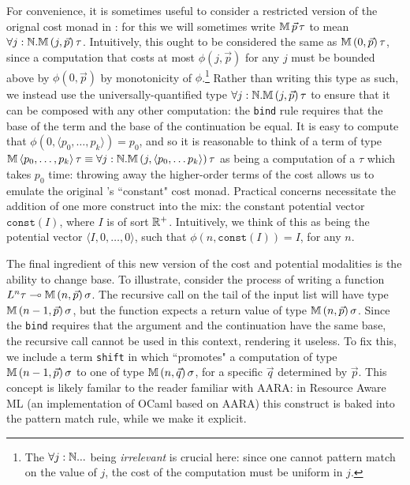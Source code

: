 For convenience, it is sometimes useful to consider a restricted version of the orignal \lambdaamor cost monad in \dlambdaamor: for this we will sometimes write $\mathbb{M} \, \vec{p} \, \tau$ to mean $\forall j : \mathbb{N}. \mathbb{M} \, (j,\vec{p}) \, \tau$. Intuitively, this ought to be considered the same as $\mathbb{M} \, (0,\vec{p}) \, \tau$, since a computation that costs at most $\phi(j,\vec{p})$ for any $j$ must be bounded above by $\phi(0,\vec{p})$ by monotonicity of $\phi$.\footnote{
The $\forall j : \mathbb{N}...$ being \textit{irrelevant} is crucial here: since one cannot pattern match on the value of $j$, the cost of the computation must be uniform in $j$.} Rather than writing this type as such, we instead use the universally-quantified type $\forall j : \mathbb{N}. \mathbb{M} \, (j,\vec{p}) \, \tau$ to ensure that it can be composed with any other computation: the \texttt{bind} rule requires that the base of the term and the base of the continuation be equal. It is easy to compute that $\phi(0,\langle p_0,\dots,p_k \rangle) = p_0$, and so it is reasonable to think of a term of type $\mathbb{M} \, \langle p_0,\dots,p_k\rangle \, \tau \equiv \forall j : \mathbb{N}. \mathbb{M} \, (j,\langle p_0,\dots p_k\rangle)\, \tau$ as being a computation of a $\tau$ which takes $p_0$ time: throwing away the higher-order terms of the cost allows us to emulate the original \lambdaamor's ``constant" cost monad. Practical concerns necessitate the addition of one more construct into the mix: the constant potential vector $\texttt{const}(I)$, where $I$ is of sort $\mathbb{R}^+$. Intuitively, we think of this as being the potential vector $\langle I,0,\dots,0 \rangle$, such that $\phi(n,\texttt{const}(I)) = I$, for any $n$.

The final ingredient of this new version of the cost and potential modalities is the ability to change base. To illustrate, consider the process of writing a function $L^n \tau \multimap \mathbb{M} \, (n,\vec{p}) \, \sigma$. The recursive call on the tail of the input list will have type $\mathbb{M} \, (n-1,\vec{p}) \, \sigma$, but the function expects a return value of type $\mathbb{M} \, (n,\vec{p}) \, \sigma$. Since the \texttt{bind} requires that the argument and the continuation have the same base, the recursive call cannot be used in this context, rendering it useless. To fix this, we include a term \texttt{shift} in \dlambdaamor which ``promotes" a computation of type $\mathbb{M} \, (n-1,\vec{p}) \, \sigma$ to one of type $\mathbb{M} \, (n,\vec{q}) \, \sigma$, for a specific $\vec{q}$ determined by $\vec{p}$. This concept is likely familar to the reader familiar with AARA: in Resource Aware ML (an implementation of OCaml based on AARA) this construct is baked into the pattern match rule, while we make it explicit.

